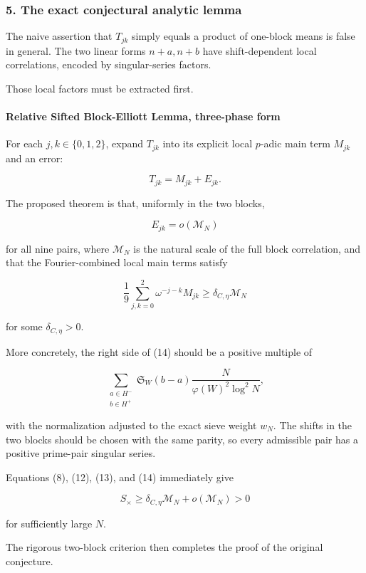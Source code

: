 \medskip
\medskip


\subsubsection*{5. The exact conjectural analytic lemma}

The naive assertion that \(T_{jk}\) simply equals a product of one-block means is false in general. The two linear forms \(n+a,n+b\) have shift-dependent local correlations, encoded by singular-series factors.

Those local factors must be extracted first.

\paragraph{Relative Sifted Block-Elliott Lemma, three-phase form}

For each \(j,k\in\{0,1,2\}\), expand \(T_{jk}\) into its explicit local \(p\)-adic main term \(M_{jk}\) and an error:

\[
T_{jk}=M_{jk}+E_{jk}.
\tag{12}
\]

The proposed theorem is that, uniformly in the two blocks,

\[
\boxed{
E_{jk}
=
o(\mathcal M_N)
}
\tag{13}
\]

for all nine pairs, where \(\mathcal M_N\) is the natural scale of the full block correlation, and that the Fourier-combined local main terms satisfy

\[
\boxed{
\frac19
\sum_{j,k=0}^2
\omega^{-j-k}M_{jk}
\ge
\delta_{C,\eta}\mathcal M_N
}
\tag{14}
\]

for some \(\delta_{C,\eta}>0\).

More concretely, the right side of (14) should be a positive multiple of

\[
\sum_{\substack{a\in H^-\\b\in H^+}}
\mathfrak S_W(b-a)
\frac{N}{\varphi(W)^2\log^2N},
\tag{15}
\]

with the normalization adjusted to the exact sieve weight \(w_N\). The shifts in the two blocks should be chosen with the same parity, so every admissible pair has a positive prime-pair singular series.

Equations (8), (12), (13), and (14) immediately give

\[
S_\times
\ge
\delta_{C,\eta}\mathcal M_N+o(\mathcal M_N)>0
\]

for sufficiently large \(N\).

The rigorous two-block criterion then completes the proof of the original conjecture.

